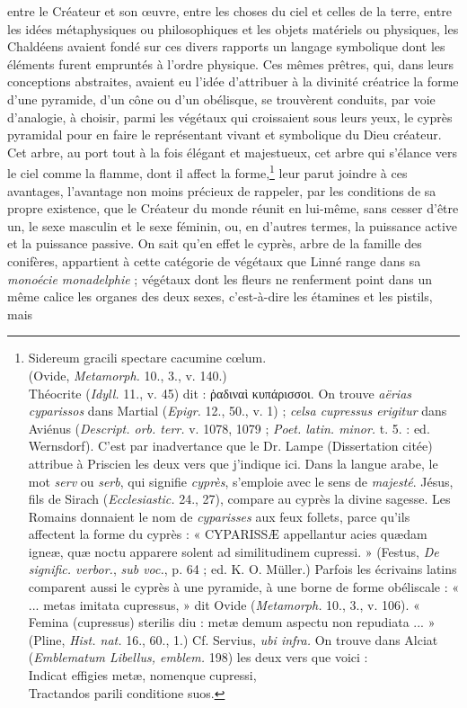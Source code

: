 \documentclass{article}
\begin{document}
entre le Créateur et son œuvre, entre les choses du ciel et celles de la terre, entre les idées métaphysiques ou philosophiques et les objets matériels ou physiques, les Chaldéens avaient fondé sur ces divers rapports un langage symbolique dont les éléments furent empruntés à l'ordre physique. Ces mêmes prêtres, qui, dans leurs conceptions abstraites, avaient eu l'idée d'attribuer à la divinité créatrice la forme d'une pyramide, d'un cône ou d'un obélisque, se trouvèrent conduits, par voie d'analogie, à choisir, parmi les végétaux qui croissaient sous leurs yeux, le cyprès pyramidal pour en faire le représentant vivant et symbolique du Dieu créateur. Cet arbre, au port tout à la fois élégant et majestueux, cet arbre qui s'élance vers le ciel comme la flamme, dont il affect la forme,\footnote{Sidereum gracili spectare cacumine cœlum.\\\hspace*{10mm}(Ovide, \emph{Metamorph.} 10., 3., v. 140.)\\\hspace*{0mm}Théocrite (\emph{Idyll.} 11., v. 45) dit : \textgreek{ῥαδιναὶ κυπάρισσοι}. On trouve \emph{aërias cyparissos} dans Martial (\emph{Epigr.} 12., 50., v. 1) ; \emph{celsa cupressus erigitur} dans Aviénus (\emph{Descript. orb. terr.} v. 1078, 1079 ; \emph{Poet. latin. minor.} t. 5. : ed. Wernsdorf). C'est par inadvertance que le Dr. Lampe (Dissertation citée) attribue à Priscien les deux vers que j'indique ici. Dans la langue arabe, le mot \emph{serv} ou \emph{serb}, qui signifie \emph{cyprès}, s'emploie avec le sens de \emph{majesté}. Jésus, fils de Sirach (\emph{Ecclesiastic.} 24., 27), compare au cyprès la divine sagesse. Les Romains donnaient le nom de \emph{cyparisses} aux feux follets, parce qu'ils affectent la forme du cyprès : « CYPARISSÆ appellantur acies quædam igneæ, quæ noctu apparere solent ad similitudinem cupressi. » (Festus, \emph{De signific. verbor.}, \emph{sub voc.}, p. 64 ; ed. K. O. Müller.) Parfois les écrivains latins comparent aussi le cyprès à une pyramide, à une borne de forme obéliscale : « ... metas imitata cupressus, » dit Ovide (\emph{Metamorph.} 10., 3., v. 106). « Femina (cupressus) sterilis diu : metæ demum aspectu non repudiata ... » (Pline, \emph{Hist. nat.} 16., 60., 1.) Cf. Servius, \emph{ubi infra.} On trouve dans Alciat (\emph{Emblematum Libellus, emblem.} 198) les deux vers que voici :\\\hspace*{10mm}Indicat effigies metæ, nomenque cupressi,\\\hspace*{15mm}Tractandos parili conditione suos.} leur parut joindre à ces avantages, l'avantage non moins précieux de rappeler, par les conditions de sa propre existence, que le Créateur du monde réunit en lui-même, sans cesser d'être un, le sexe masculin et le sexe féminin, ou, en d'autres termes, la puissance active et la puissance passive. On sait qu'en effet le cyprès, arbre de la famille des conifères, appartient à cette catégorie de végétaux que Linné range dans sa \emph{monoécie monadelphie} ; végétaux dont les fleurs ne renferment point dans un même calice les organes des deux sexes, c'est-à-dire les étamines et les pistils, mais 
\end{document}
